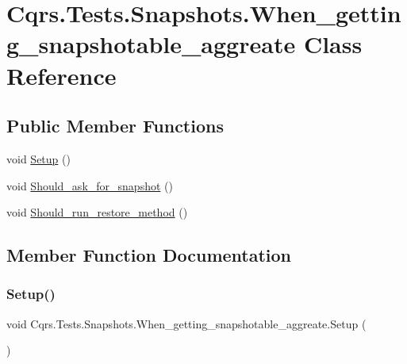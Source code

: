 \hypertarget{classCqrs_1_1Tests_1_1Snapshots_1_1When__getting__snapshotable__aggreate}{}\section{Cqrs.\+Tests.\+Snapshots.\+When\+\_\+getting\+\_\+snapshotable\+\_\+aggreate Class Reference}
\label{classCqrs_1_1Tests_1_1Snapshots_1_1When__getting__snapshotable__aggreate}
\subsection*{Public Member Functions}
\begin{DoxyCompactItemize}
\item 
void \hyperlink{classCqrs_1_1Tests_1_1Snapshots_1_1When__getting__snapshotable__aggreate_a4f25b49d955c717d0ddbef37c662bfb4}{Setup} ()
\item 
void \hyperlink{classCqrs_1_1Tests_1_1Snapshots_1_1When__getting__snapshotable__aggreate_ab56b6055ea95703fa4c10ae31205191b}{Should\+\_\+ask\+\_\+for\+\_\+snapshot} ()
\item 
void \hyperlink{classCqrs_1_1Tests_1_1Snapshots_1_1When__getting__snapshotable__aggreate_adec6028129afb8fe11a3069d3d3aa956}{Should\+\_\+run\+\_\+restore\+\_\+method} ()
\end{DoxyCompactItemize}


\subsection{Member Function Documentation}
\mbox{\label{classCqrs_1_1Tests_1_1Snapshots_1_1When__getting__snapshotable__aggreate_a4f25b49d955c717d0ddbef37c662bfb4}} 
\subsubsection{\texorpdfstring{Setup()}{Setup()}}
{\footnotesize\ttfamily void Cqrs.\+Tests.\+Snapshots.\+When\+\_\+getting\+\_\+snapshotable\+\_\+aggreate.\+Setup (\begin{DoxyParamCaption}{ }\end{DoxyParamCaption})}


